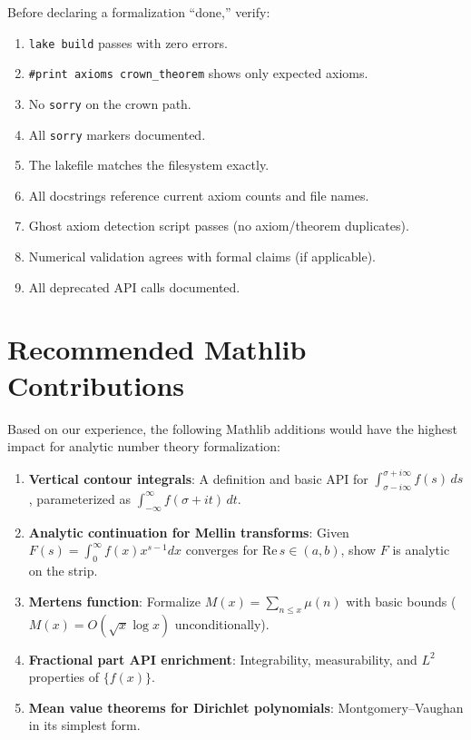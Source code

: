 \documentclass[11pt,a4paper]{article}
\newcommand{\lean}[1]{\texttt{#1}}
\begin{document}
Before declaring a formalization ``done,'' verify:

\begin{enumerate}
  \item[$\square$] \lean{lake build} passes with zero errors.
  \item[$\square$] \lean{\#print axioms crown\_theorem} shows only
    expected axioms.
  \item[$\square$] No \lean{sorry} on the crown path.
  \item[$\square$] All \lean{sorry} markers documented.
  \item[$\square$] The lakefile matches the filesystem exactly.
  \item[$\square$] All docstrings reference current axiom counts
    and file names.
  \item[$\square$] Ghost axiom detection script passes (no axiom/theorem
    duplicates).
  \item[$\square$] Numerical validation agrees with formal claims (if
    applicable).
  \item[$\square$] All deprecated API calls documented.
\end{enumerate}

\section{Recommended Mathlib Contributions}
\label{sec:contributions}

Based on our experience, the following Mathlib additions would have
the highest impact for analytic number theory formalization:

\begin{enumerate}
  \item \textbf{Vertical contour integrals}: A definition and basic
    API for $\int_{\sigma-i\infty}^{\sigma+i\infty} f(s)\,ds$,
    parameterized as $\int_{-\infty}^{\infty} f(\sigma+it)\,dt$.
  \item \textbf{Analytic continuation for Mellin transforms}: Given
    $F(s) = \int_0^\infty f(x)x^{s-1}dx$ converges for
    $\mathrm{Re}\,s \in (a,b)$, show $F$ is analytic on the strip.
  \item \textbf{Mertens function}: Formalize $M(x) = \sum_{n \leq x}
    \mu(n)$ with basic bounds ($M(x) = O(\sqrt{x}\log x)$
    unconditionally).
  \item \textbf{Fractional part API enrichment}: Integrability,
    measurability, and $L^2$ properties of $\{f(x)\}$.
  \item \textbf{Mean value theorems for Dirichlet polynomials}:
    Montgomery--Vaughan in its simplest form.
\end{enumerate}
\end{document}
